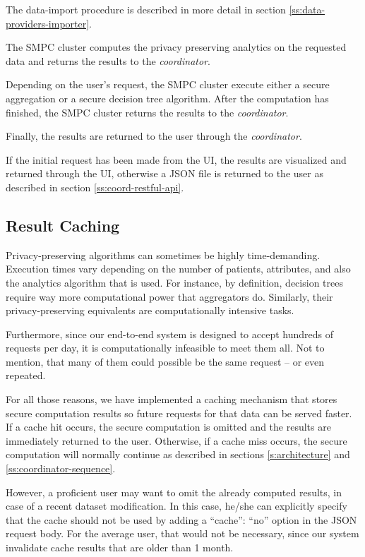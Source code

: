 \begin{description}[labelwidth=4em, leftmargin=\dimexpr\labelwidth+\labelsep\relax]
  The data\hyp import procedure is described in more detail in section \ref{ss:data-providers-importer}.


  \item [Step 4:] The SMPC cluster computes the privacy preserving analytics on the requested data and returns the results to the \textit{coordinator}.

  Depending on the user's request, the SMPC cluster execute either a secure aggregation or a secure decision tree algorithm.
  After the computation has finished, the SMPC cluster returns the results to the \textit{coordinator}.


  \item [Step 5:] Finally, the results are returned to the user through the \textit{coordinator}.

  If the initial request has been made from the UI, the results are visualized and returned through the UI, otherwise a JSON file is returned to the user as described in section \ref{ss:coord-restful-api}.

\end{description}



\subsection{Result Caching}\label{ss:caching}
Privacy-preserving algorithms can sometimes be highly time-demanding.
Execution times vary depending on the number of patients, attributes, and also the analytics algorithm that is used.
For instance, by definition, decision trees require way more computational power that aggregators do.
Similarly, their privacy\hyp preserving equivalents are computationally intensive tasks.

Furthermore, since our end-to-end system is designed to accept hundreds of requests per day, it is computationally infeasible to meet them all.
Not to mention, that many of them could possible be the same request -- or even repeated.

For all those reasons, we have implemented a caching mechanism that stores secure computation results so future requests for that data can be served faster.
If a cache hit occurs, the secure computation is omitted and the results are immediately returned to the user.
Otherwise, if a cache miss occurs, the secure computation will normally continue as described in sections \ref{s:architecture} and \ref{ss:coordinator-sequence}.

However, a proficient user may want to omit the already computed results, in case of a recent dataset modification.
In this case, he/she can explicitly specify that the cache should not be used by adding a ``cache'': ``no'' option in the JSON request body.
For the average user, that would not be necessary, since our system invalidate cache results that are older than 1 month.





